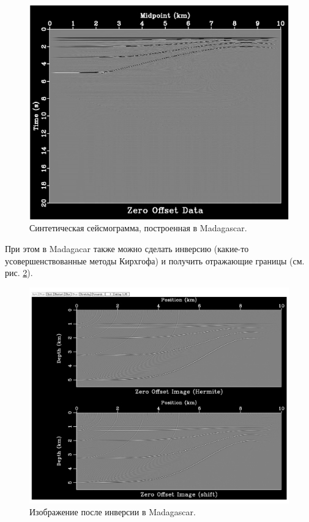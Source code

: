 \documentclass{article}
\begin{document}
\begin{figure}[ht]
  \center
  \includegraphics[scale=0.3]{pic/madagascar_input.png}
  \caption{Синтетическая сейсмограмма, построенная в Madagascar.}
\label{img_madagascar_input}
\end{figure}

При этом в Madagacar также можно сделать инверсию (какие-то усовершенствованные методы Кирхгофа) и получить отражающие границы (см. рис. \ref{img_madagascar_inverted}).

\begin{figure}[ht]
  \center
  \includegraphics[scale=0.3]{pic/madagascar_inverted.png}
  \caption{Изображение после инверсии в Madagascar.}
\label{img_madagascar_inverted}
\end{figure}
\end{document}
